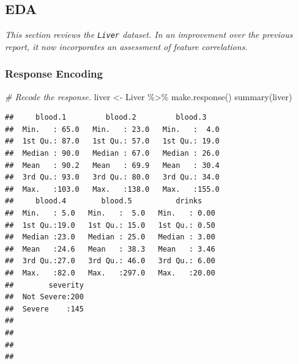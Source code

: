 \documentclass[
  11pt,
  a4paper,
]{scrartcl}
\newenvironment{Shaded}{\begin{snugshade}}{\end{snugshade}}
\newcommand{\CommentTok}[1]{\textcolor[rgb]{0.56,0.35,0.01}{\textit{#1}}}
\newcommand{\FunctionTok}[1]{\textcolor[rgb]{0.00,0.00,0.00}{#1}}
\newcommand{\NormalTok}[1]{#1}
\newcommand{\OtherTok}[1]{\textcolor[rgb]{0.56,0.35,0.01}{#1}}
\newcommand{\SpecialCharTok}[1]{\textcolor[rgb]{0.00,0.00,0.00}{#1}}
\newcommand{\StringTok}[1]{\textcolor[rgb]{0.31,0.60,0.02}{#1}}
\begin{document}
\hypertarget{eda}{%
\subsection{EDA}\label{eda}}

\emph{This section reviews the \texttt{Liver} dataset. In an improvement
over the previous report, it now incorporates an assessment of feature
correlations.}

\hypertarget{response-encoding}{%
\subsubsection{Response Encoding}\label{response-encoding}}

\begin{Shaded}
\begin{Highlighting}[]
\CommentTok{\# Recode the response.}
\NormalTok{liver }\OtherTok{\textless{}{-}}\NormalTok{ Liver }\SpecialCharTok{\%\textgreater{}\%} \FunctionTok{make.response}\NormalTok{()}
\FunctionTok{summary}\NormalTok{(liver)}
\end{Highlighting}
\end{Shaded}

\begin{verbatim}
##     blood.1         blood.2         blood.3     
##  Min.   : 65.0   Min.   : 23.0   Min.   :  4.0  
##  1st Qu.: 87.0   1st Qu.: 57.0   1st Qu.: 19.0  
##  Median : 90.0   Median : 67.0   Median : 26.0  
##  Mean   : 90.2   Mean   : 69.9   Mean   : 30.4  
##  3rd Qu.: 93.0   3rd Qu.: 80.0   3rd Qu.: 34.0  
##  Max.   :103.0   Max.   :138.0   Max.   :155.0  
##     blood.4        blood.5          drinks     
##  Min.   : 5.0   Min.   :  5.0   Min.   : 0.00  
##  1st Qu.:19.0   1st Qu.: 15.0   1st Qu.: 0.50  
##  Median :23.0   Median : 25.0   Median : 3.00  
##  Mean   :24.6   Mean   : 38.3   Mean   : 3.46  
##  3rd Qu.:27.0   3rd Qu.: 46.0   3rd Qu.: 6.00  
##  Max.   :82.0   Max.   :297.0   Max.   :20.00  
##        severity  
##  Not Severe:200  
##  Severe    :145  
##                  
##                  
##                  
## 
\end{verbatim}

\begin{Shaded}
\end{Shaded}
\end{document}
